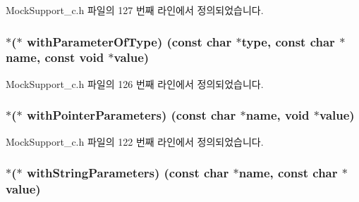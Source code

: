 Mock\+Support\+\_\+c.\+h 파일의 127 번째 라인에서 정의되었습니다.

\subsubsection[{\texorpdfstring{with\+Parameter\+Of\+Type}{withParameterOfType}}]{$\ast$($\ast$ with\+Parameter\+Of\+Type) (const char $\ast$type, const char $\ast$name, const void $\ast$value)}\hypertarget{struct_s_mock_expected_call__c_a588e8bafc44b2da188fbdb5377bf41ec}{}\label{struct_s_mock_expected_call__c_a588e8bafc44b2da188fbdb5377bf41ec}


Mock\+Support\+\_\+c.\+h 파일의 126 번째 라인에서 정의되었습니다.

\subsubsection[{\texorpdfstring{with\+Pointer\+Parameters}{withPointerParameters}}]{$\ast$($\ast$ with\+Pointer\+Parameters) (const char $\ast$name, void $\ast$value)}\hypertarget{struct_s_mock_expected_call__c_af8e593d8f6a593685e6769804a9e762f}{}\label{struct_s_mock_expected_call__c_af8e593d8f6a593685e6769804a9e762f}


Mock\+Support\+\_\+c.\+h 파일의 122 번째 라인에서 정의되었습니다.

\subsubsection[{\texorpdfstring{with\+String\+Parameters}{withStringParameters}}]{$\ast$($\ast$ with\+String\+Parameters) (const char $\ast$name, const char $\ast$value)}\hypertarget{struct_s_mock_expected_call__c_a06c4d87daf983fa91fe8a19ac2a53aaa}{}\label{struct_s_mock_expected_call__c_a06c4d87daf983fa91fe8a19ac2a53aaa}


